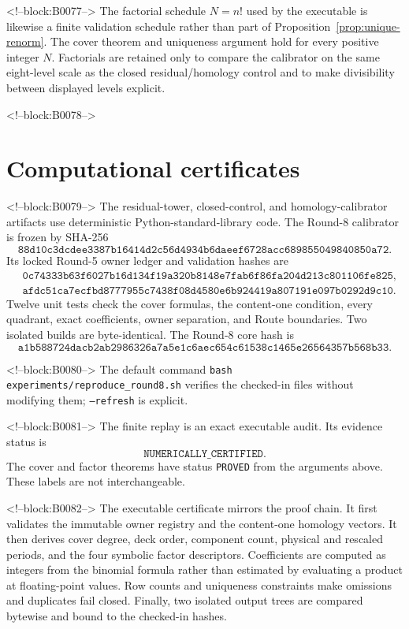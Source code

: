 \documentclass[11pt]{article}
\theoremstyle{definition}
\theoremstyle{remark}
\begin{document}
<!--block:B0077-->
The factorial schedule $N=n!$ used by the executable is likewise a finite validation schedule rather than part of Proposition~\ref{prop:unique-renorm}. The cover theorem and uniqueness argument hold for every positive integer $N$. Factorials are retained only to compare the calibrator on the same eight-level scale as the closed residual/homology control and to make divisibility between displayed levels explicit.

<!--block:B0078-->
\section{Computational certificates}

<!--block:B0079-->
The residual-tower, closed-control, and homology-calibrator artifacts use deterministic Python-standard-library code. The Round-8 calibrator is frozen by SHA-256
\[
\texttt{88d10c3dcdee3387b16414d2c56d4934b6daeef6728acc689855049840850a72}.
\]
Its locked Round-5 owner ledger and validation hashes are
\begin{align*}
&\texttt{0c74333b63f6027b16d134f19a320b8148e7fab6f86fa204d213c801106fe825},\\
&\texttt{afdc51ca7ecfbd8777955c7438f08d4580e6b924419a807191e097b0292d9c10}.
\end{align*}
Twelve unit tests check the cover formulas, the content-one condition, every quadrant, exact coefficients, owner separation, and Route boundaries. Two isolated builds are byte-identical. The Round-8 core hash is
\[
\texttt{a1b588724dacb2ab2986326a7a5e1c6aec654c61538c1465e26564357b568b33}.
\]

<!--block:B0080-->
The default command \texttt{bash experiments/reproduce\_round8.sh} verifies the checked-in files without modifying them; \texttt{--refresh} is explicit.

<!--block:B0081-->
The finite replay is an exact executable audit. Its evidence status is
\[
\texttt{NUMERICALLY\_CERTIFIED}.
\]
The cover and factor theorems have status \texttt{PROVED} from the arguments above. These labels are not interchangeable.

<!--block:B0082-->
The executable certificate mirrors the proof chain. It first validates the immutable owner registry and the content-one homology vectors. It then derives cover degree, deck order, component count, physical and rescaled periods, and the four symbolic factor descriptors. Coefficients are computed as integers from the binomial formula rather than estimated by evaluating a product at floating-point values. Row counts and uniqueness constraints make omissions and duplicates fail closed. Finally, two isolated output trees are compared bytewise and bound to the checked-in hashes.
\end{document}
